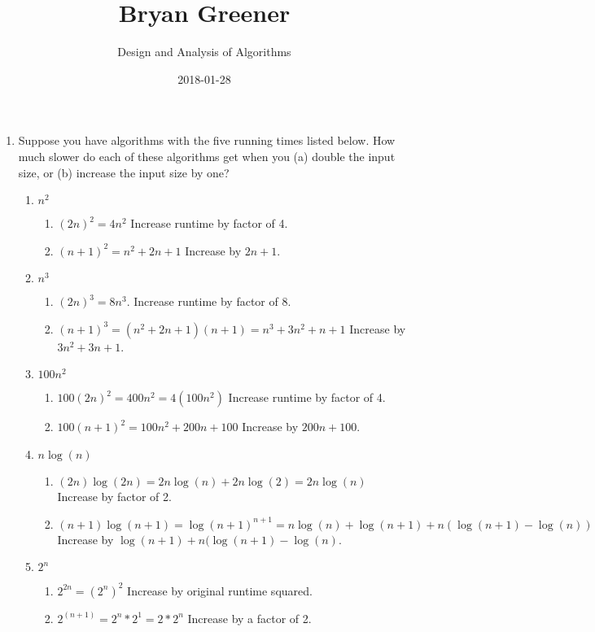 \documentclass[12pt]{article}
\title{Bryan Greener}
\author{Design and Analysis of Algorithms}
\date{2018-01-28}
\begin{document}
\maketitle

\TabPositions{4cm}

\begin{enumerate}
\item Suppose you have algorithms with the five running times listed below. How much slower do each of these algorithms get when you (a) double the input size, or (b) increase the input size by one?
	\begin{enumerate}
	\item $n^2$
		\begin{enumerate}
		\item $(2n)^2 = 4n^2$ Increase runtime by factor of 4.
		\item $(n+1)^2 = n^2+2n+1$ Increase by $2n+1$.
		\end{enumerate}
	\item $n^3$
		\begin{enumerate}
		\item $(2n)^3 = 8n^3$. Increase runtime by factor of 8.
		\item $(n+1)^3 = (n^2+2n+1)(n+1) = n^3+3n^2+n+1$ Increase by $3n^2+3n+1$.
		\end{enumerate}
	\item $100n^2$
		\begin{enumerate}
		\item $100(2n)^2 = 400n^2 = 4(100n^2)$ Increase runtime by factor of 4.
		\item $100(n+1)^2 = 100n^2+200n+100$ Increase by $200n+100$.
		\end{enumerate}
	\item $n \log(n)$
		\begin{enumerate}
		\item $(2n)\log(2n) = 2n\log(n)+2n\log(2) = 2n\log(n)$ Increase by factor of 2.
		\item $(n+1)\log(n+1) = \log(n+1)^{n+1} = n\log(n)+\log(n+1)+n(\log(n+1)-\log(n))$ Increase by $\log(n+1)+n(\log(n+1)-\log(n)$.
		\end{enumerate}
	\item $2^n$
		\begin{enumerate}
		\item $2^{2n} = (2^n)^2$ Increase by original runtime squared. 
		\item $2^(n+1) = 2^n*2^1 = 2*2^n$ Increase by a factor of 2.

\end{enumerate}
\end{enumerate}
\end{enumerate}
\end{document}
